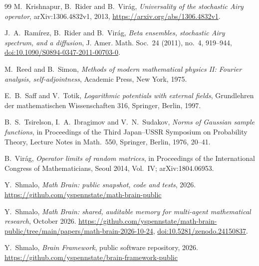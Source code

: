 \documentclass[11pt]{article}
\theoremstyle{remark}
\providecommand{\doi}[1]{\href{https://doi.org/#1}{doi:#1}}
\begin{document}
\begin{thebibliography}{99}
M.~Krishnapur, B.~Rider and B.~Vir\'ag, \emph{Universality of the stochastic Airy operator}, arXiv:1306.4832v1, 2013,
\url{https://arxiv.org/abs/1306.4832v1}.

J.~A.~Ram\'irez, B.~Rider and B.~Vir\'ag, \emph{Beta ensembles, stochastic Airy spectrum, and a diffusion}, J. Amer.
Math. Soc.\ 24 (2011), no.~4, 919--944, \doi{10.1090/S0894-0347-2011-00703-0}.

M.~Reed and B.~Simon, \emph{Methods of modern mathematical physics II: Fourier analysis, self-adjointness}, Academic
Press, New York, 1975.

E.~B.~Saff and V.~Totik, \emph{Logarithmic potentials with external fields}, Grundlehren der mathematischen
Wissenschaften 316, Springer, Berlin, 1997.

B.~S.~Tsirelson, I.~A.~Ibragimov and V.~N.~Sudakov, \emph{Norms of Gaussian sample functions}, in Proceedings of the
Third Japan--USSR Symposium on Probability Theory, Lecture Notes in Math.\ 550, Springer, Berlin, 1976, 20--41.

B.~Vir\'ag, \emph{Operator limits of random matrices}, in Proceedings of the International Congress of Mathematicians,
Seoul 2014, Vol.~IV; arXiv:1804.06953.

Y.~Shmalo, \emph{Math Brain: public snapshot, code and tests}, 2026.
\url{https://github.com/yspennstate/math-brain-public}

Y.~Shmalo, \emph{Math Brain: shared, auditable memory for multi-agent mathematical research}, October 2026.
\url{https://github.com/yspennstate/math-brain-public/tree/main/papers/math-brain-2026-10-24},
\doi{10.5281/zenodo.24150837}.

Y.~Shmalo, \emph{Brain Framework}, public software repository, 2026.
\url{https://github.com/yspennstate/brain-framework-public}

\end{thebibliography}
\end{document}
